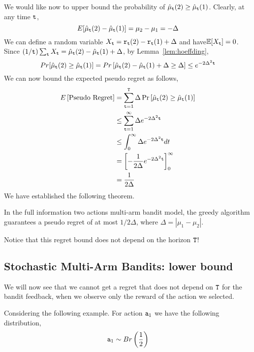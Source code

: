 We would like now to upper bound the probability of $\hat{\mu}_{{\tt t}}(2)\ge \hat{\mu}_{{\tt t}}(1)$. 
Clearly, at any time ${\tt t}$,
\[
E[\hat{\mu}_{{\tt t}}(2)-\hat{\mu}_{{\tt t}}(1)]=\mu_{2}-\mu_{1}=-\Delta
\]
We can define a random variable $X_{{\tt t}}={\tt r}_{{\tt t}}(2)-{\tt r}_{{\tt t}}(1)+\Delta$ and have$\mathbb{E}[X_{{\tt t}}]=0$. Since $(1/{\tt t})\sum_{{\tt t}} X_{{\tt t}} = \hat{\mu}_{{\tt t}}(2)- \hat{\mu}_{{\tt t}}(1)+\Delta$, by
Lemma~\ref{lem:hoeffding},
\[
Pr[\hat{\mu}_{\tt t}(2)\geq \hat{\mu}_{\tt t}(1)]= Pr\left[\hat{\mu}_{{\tt t}}(2)-\hat{\mu}_{{\tt t}}(1)+\Delta
\ge\Delta\right]\le e^{-2\Delta^{2}{\tt t}}
\]
We can now bound the expected pseudo regret as follows,
\begin{align*}
E\left[\text{Pseudo Regret}\right] & = 
 \sum_{{\tt t}=1}^{{\tt T}}\Delta\Pr\left[\hat{\mu}_{\tt t}(2)\geq \hat{\mu}_{\tt t}(1)\right]\\
 & \le   \sum_{{\tt t}=1}^{\infty}\Delta e^{-2\Delta^{2}{\tt t}}\\
 & \le  \int_{0}^{\infty}\Delta e^{-2\Delta^{2}{\tt t}}dt\\
 & =  \left[-\frac{1}{2\Delta}e^{-2\Delta^{2}{\tt t}}\right]_{0}^{\infty}\\
 & =  \frac{1}{2\Delta}
\end{align*}
We have established the following theorem.
\begin{theorem}
In the full information two actions multi-arm bandit model, the greedy algorithm guarantees a pseudo regret of at most $1/2\Delta$, where $\Delta=|\mu_1-\mu_2|$.
\end{theorem}

Notice that this regret bound does not depend on  the horizon ${\tt T}$!

\subsection{Stochastic Multi-Arm Bandits: lower bound}


We will now see that we cannot get a regret that does not depend on ${\tt T}$ for the bandit feedback, when we observe only the reward of the action we selected.

Considering the following example. For action ${\tt a}_1$ we have the following distribution,
\[
{\tt a}_{1}\sim Br\left(\frac{1}{2}\right)\]

